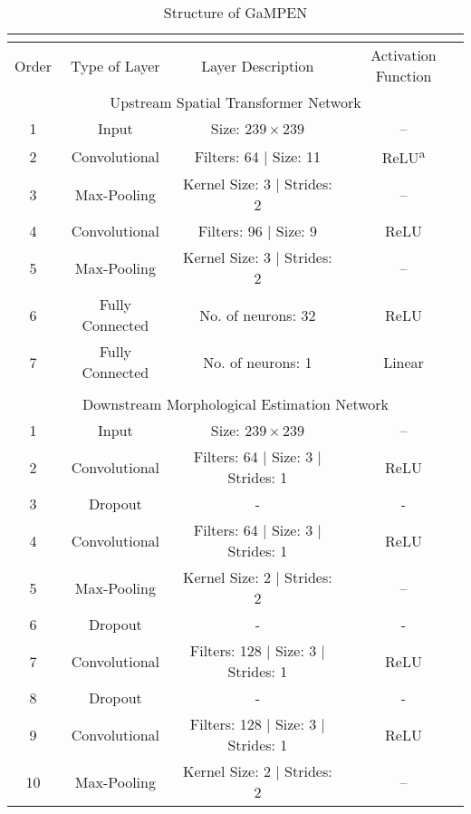 \begin{longtable}{cccc}
    \caption{Structure of GaMPEN}\\
    \label{tab_c2:network_layers}\\
    \hline
    \hline
    Order & Type of Layer & Layer Description & Activation Function \\
    \hline
    \hline
    \multicolumn{4}{c}{Upstream Spatial Transformer Network} \\
        \hline 
        \hline
        1 & Input & Size: $239\times239$ & --  \\
        2 & Convolutional & Filters: 64 $\vert$ Size: 11 & ReLU\textsuperscript{a} \\
        3 & Max-Pooling & Kernel Size: 3 $\vert$ Strides: 2 & -- \\
        4 & Convolutional & Filters: 96 $\vert$ Size: 9 & ReLU \\
        5 & Max-Pooling & Kernel Size: 3 $\vert$ Strides: 2 & -- \\
        6 & Fully Connected & No. of neurons: 32 & ReLU \\
        7 & Fully Connected & No. of neurons: 1 & Linear \\
        & & & \\
        \hline
        \hline
        \multicolumn{4}{c}{Downstream Morphological Estimation Network} \\
        \hline
        \hline
        1 & Input & Size: $239\times239$ & --  \\
        2 & Convolutional & Filters: 64 $\vert$ Size: 3 $\vert$ Strides: 1 & ReLU \\
        3 & Dropout & - & - \\
        4 & Convolutional & Filters: 64 $\vert$ Size: 3 $\vert$ Strides: 1 & ReLU \\
        5 & Max-Pooling & Kernel Size: 2 $\vert$ Strides: 2 & -- \\
        6 & Dropout & - & - \\
        7 & Convolutional & Filters: 128 $\vert$ Size: 3 $\vert$ Strides: 1 & ReLU \\
        8 & Dropout & - & - \\
        9 & Convolutional & Filters: 128 $\vert$ Size: 3 $\vert$ Strides: 1 & ReLU \\
        10 & Max-Pooling & Kernel Size: 2 $\vert$ Strides: 2 & -- \\

\end{longtable}
